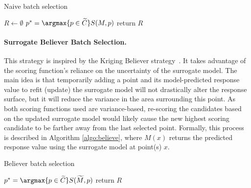{\fontsize{10}{10}\selectfont
\begin{algorithm}
\scriptsize
\caption{Naive batch selection}
\label{algo:naive}
\begin{algorithmic}
  \State $R \gets \emptyset$
  \State $p^* = \argmax{p \in \widetilde{C}} S(M, p)$
  \EndWhile
  \State return $R$
\EndProcedure
\end{algorithmic}
\end{algorithm}
}

\paragraph{Surrogate Believer Batch Selection.}
This strategy is inspired by the Kriging Believer strategy~\cite{GotovosCasatiHitz2013,GinsbourgerLeRicheCarraro2009}.
%
It takes advantage of the scoring function's reliance on the uncertainty of the surrogate model.
%
The main idea is that temporarily adding a point and its model-predicted response value to refit (update) the surrogate model will not drastically alter the response surface, but it will reduce the variance in the area surrounding this point.
%
As both scoring functions used are variance-based, re-scoring the candidates based on the updated surrogate model would likely cause the new highest scoring candidate to be farther away from the last selected point.
%
Formally, this process is described in Algorithm \ref{algo:believe}, where $M(x)$ returns the predicted response value using the surrogate model at point(s) $x$.

{\fontsize{10}{10}\selectfont
\begin{algorithm}
\scriptsize
\caption{Believer batch selection}
\label{algo:believe}
\begin{algorithmic}
  \State $p^* = \argmax{p \in \widetilde{C}} S(\widetilde{M}, p)$
\EndWhile
\State return $R$
\EndProcedure
\end{algorithmic}
\end{algorithm}
}

